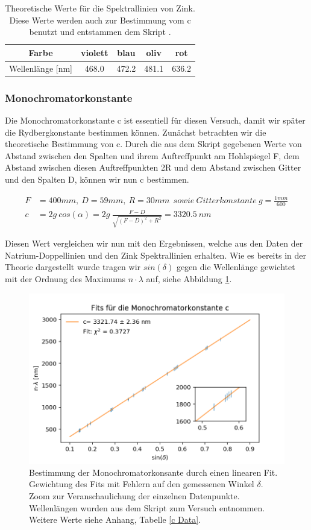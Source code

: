 \documentclass[]{article}
\begin{document}
\begin{table}[H]
	\centering
	\begin{tabular}{c|c|c|c|c}
		Farbe & violett & blau & oliv  & rot \\
		\hline
		Wellenlänge [nm]  & 468.0 & 472.2 & 481.1 & 636.2 \\
	\end{tabular}
	\caption{Theoretische Werte für die Spektrallinien von Zink. Diese Werte werden auch zur Bestimmung vom c benutzt und entstammen dem Skript \cite{skript}.}
\end{table}

\subsubsection{Monochromatorkonstante}
Die Monochromatorkonstante c ist essentiell für diesen Versuch, damit wir später die Rydbergkonstante bestimmen  können. Zunächst betrachten wir die theoretische Bestimmung von c. Durch die aus dem Skript gegebenen Werte von Abstand zwischen den Spalten und ihrem Auftreffpunkt am Hohlspiegel F, dem Abstand zwischen diesen Auftreffpunkten 2R und dem Abstand zwischen Gitter und den Spalten D, können wir nun c bestimmen. 

\begin{align}
F&= 400mm ,\: D= 59mm ,\: R=30mm \:\: sowie \: Gitterkonstante \: g=\frac{1mm}{600} \\
c&= 2g\: cos(\alpha) = 2g\: \frac{F-D}{\sqrt{(F-D)^2 + R^2}} = 3320.5\:nm
\end{align}

Diesen Wert vergleichen wir nun mit den Ergebnissen, welche aus den Daten der Natrium-Doppellinien und den Zink Spektrallinien erhalten. Wie es bereits in der Theorie dargestellt wurde tragen wir $sin(\delta)$ gegen die Wellenlänge gewichtet mit der Ordnung des Maximums $n\cdot\lambda$ auf, siehe Abbildung \ref{fig:MonoConst}.

\begin{figure}[H]
\centering
\includegraphics[width=.9\linewidth]{Plots/Monochromatorkonstante.png}
\caption{Bestimmung der Monochromatorkonsante durch einen linearen Fit. Gewichtung des Fits mit Fehlern auf den gemessenen Winkel $\delta$. Zoom zur Veranschaulichung der einzelnen Datenpunkte. Wellenlängen wurden aus dem Skript zum Versuch \cite{skript} entnommen. Weitere Werte siehe Anhang, Tabelle \ref{c Data}. }
\label{fig:MonoConst}
\end{figure}
\end{document}
